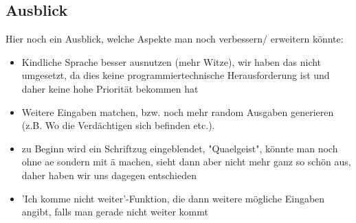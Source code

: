 \documentclass[10pt,a4paper]{article}
\begin{document}
\subsection*{Ausblick}
Hier noch ein Ausblick, welche Aspekte man noch verbessern/ erweitern könnte:
\begin{itemize}
\item Kindliche Sprache besser ausnutzen (mehr Witze), wir haben das nicht umgesetzt, da dies keine programmiertechnische Herausforderung ist und daher keine hohe Priorität bekommen hat
\item Weitere Eingaben matchen, bzw. noch mehr random Ausgaben generieren (z.B. Wo die Verdächtigen sich befinden etc.).
\item zu Beginn wird ein Schriftzug eingeblendet, "Quaelgeist", könnte man noch ohne ae sondern mit ä machen, sieht dann aber nicht mehr ganz so schön aus, daher haben wir uns dagegen entschieden
\item 'Ich komme nicht weiter'-Funktion, die dann weitere mögliche Eingaben angibt, falls man gerade nicht weiter kommt
\end{itemize}
\end{document}
